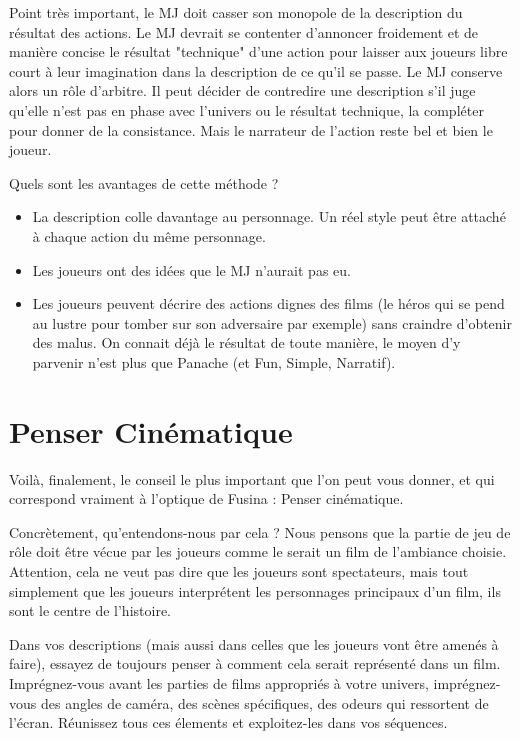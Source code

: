 Point très important, le MJ doit casser son monopole de la description du résultat des actions. Le MJ devrait se contenter d'annoncer froidement et de manière concise le résultat "technique" d'une action pour laisser aux joueurs libre court à leur imagination dans la description de ce qu'il se passe. Le MJ conserve alors un rôle d'arbitre. Il peut décider de contredire une description s'il juge qu'elle n'est pas en phase avec l'univers ou le résultat technique, la compléter pour donner de la consistance. Mais le narrateur de l'action reste bel et bien le joueur.

Quels sont les avantages de cette méthode ?

\begin{itemize}
\item La description colle davantage au personnage. Un réel style peut être attaché à chaque action du même personnage.
\item Les joueurs ont des idées que le MJ n'aurait pas eu.
\item Les joueurs peuvent décrire des actions dignes des films (le héros qui se pend au lustre pour tomber sur son adversaire par exemple) sans craindre d'obtenir des malus. On connait déjà le résultat de toute manière, le moyen d'y parvenir n'est plus que Panache (et Fun, Simple, Narratif).
\end{itemize}

\section{Penser Cinématique}

Voilà, finalement, le conseil le plus important que l'on peut vous donner, et qui correspond vraiment à l'optique de Fusina : Penser cinématique.

Concrètement, qu'entendons-nous par cela ? Nous pensons que la partie de jeu de rôle doit être vécue par les joueurs comme le serait un film de l'ambiance choisie. Attention, cela ne veut pas dire que les joueurs sont spectateurs, mais tout simplement que les joueurs interprétent les personnages principaux d'un film, ils sont le centre de l'histoire. 

Dans vos descriptions (mais aussi dans celles que les joueurs vont être amenés à faire), essayez de toujours penser à comment cela serait représenté dans un film. Imprégnez-vous avant les parties de films appropriés à votre univers, imprégnez-vous des angles de caméra, des scènes spécifiques, des odeurs qui ressortent de l'écran. Réunissez tous ces élements et exploitez-les dans vos séquences.

